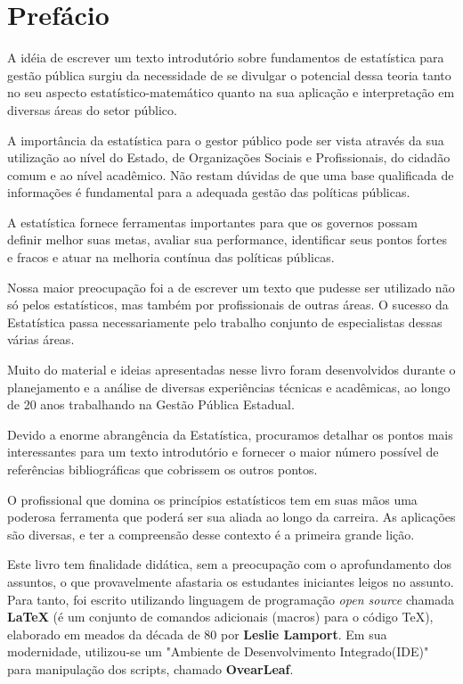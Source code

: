 \chapter*{Prefácio}

\inic A idéia de escrever um texto introdutório sobre fundamentos de estatística para gestão pública surgiu da necessidade de se divulgar o potencial dessa teoria tanto no
seu aspecto estatístico-matemático quanto na sua aplicação e
interpretação em diversas áreas do setor público.\vst

A importância da estatística para o gestor público pode ser vista através da sua utilização ao nível do Estado, de Organizações Sociais e Profissionais, do cidadão comum e ao nível acadêmico. Não restam dúvidas de que uma base qualificada de informações é fundamental para a adequada gestão das políticas públicas.\vst  

A estatística fornece ferramentas importantes para que os governos possam definir melhor suas metas, avaliar sua performance, identificar seus pontos fortes e fracos e atuar na melhoria contínua das políticas públicas.
\vst

Nossa maior preocupação foi a de escrever um texto que pudesse ser
utilizado não só pelos estatísticos, mas também por profissionais de outras áreas. O sucesso da Estatística passa necessariamente
pelo trabalho conjunto de especialistas dessas várias áreas. \vst

Muito do material e ideias apresentadas nesse livro foram
desenvolvidos durante o planejamento e a análise de diversas experiências técnicas e acadêmicas, ao longo de 20 anos trabalhando na Gestão Pública Estadual.
\vst 


Devido a enorme abrangência da Estatística, procuramos detalhar os pontos mais interessantes para um texto introdutório e fornecer o maior número possível de referências bibliográficas que cobrissem os outros pontos.\vst

O profissional que domina os princípios estatísticos tem em suas mãos uma poderosa ferramenta que poderá ser sua aliada ao longo da carreira. As aplicações são diversas, e ter a compreensão desse contexto é a primeira grande lição.
\vst

\newpage
Este livro tem finalidade didática, sem a preocupação com o aprofundamento dos assuntos, o que provavelmente afastaria os estudantes iniciantes leigos no assunto. Para tanto, foi escrito utilizando linguagem de programação \textit{open source} chamada \textbf{\LaTeX} (é um conjunto de comandos adicionais (macros) para o código \TeX), elaborado em meados da década de 80 por \textbf{Leslie Lamport}. Em sua modernidade, utilizou-se um "Ambiente de Desenvolvimento Integrado(IDE)" para manipulação dos scripts, chamado \textbf{OvearLeaf}. \vst


